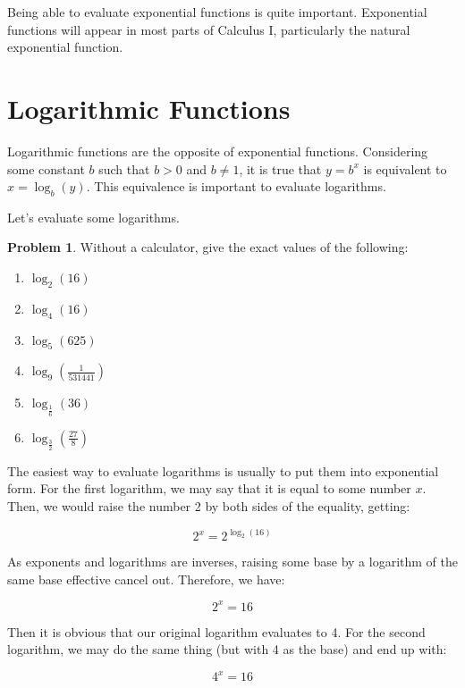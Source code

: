 \documentclass[12pt]{article}
\theoremstyle{definition}
\newtheorem{problem}{Problem}
\begin{document}
Being able to evaluate exponential functions is quite important.
Exponential functions will appear in most parts of Calculus I, particularly the natural exponential function.

\section{Logarithmic Functions}

Logarithmic functions are the opposite of exponential functions.
Considering some constant $b$ such that $b>0$ and $b\neq1$, it is true that $y=b^x$ is equivalent to $x=\log_b(y)$.
This equivalence is important to evaluate logarithms.

Let's evaluate some logarithms.

\begin{problem}
Without a calculator, give the exact values of the following:
\begin{enumerate}
    \item $\log_2(16)$
    \item $\log_4(16)$
    \item $\log_5(625)$
    \item $\log_9(\frac{1}{531441})$
    \item $\log_{\frac{1}{6}}(36)$
    \item $\log_{\frac{3}{2}}(\frac{27}{8})$
\end{enumerate}
\end{problem}

The easiest way to evaluate logarithms is usually to put them into exponential form.
For the first logarithm, we may say that it is equal to some number $x$.
Then, we would raise the number 2 by both sides of the equality, getting:

\begin{equation}
    2^x = 2^{\log_2(16)}
\end{equation}

As exponents and logarithms are inverses, raising some base by a logarithm of the same base effective cancel out.
Therefore, we have:

\begin{equation}
    2^x = 16
\end{equation}

Then it is obvious that our original logarithm evaluates to 4.
For the second logarithm, we may do the same thing (but with 4 as the base) and end up with:

\begin{equation}
    4^x = 16
\end{equation}
\end{document}
